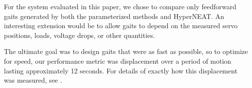 
For the system evaluated in this paper, we chose to compare only
feedforward gaits generated by both the parameterized methods and
HyperNEAT.  An interesting extension would be to allow gaits to depend
on the measured servo positions, loads, voltage drops, or other
quantities.

The ultimate goal was to design gaits that were as fast as possible,
so to optimize for speed, our performance metric was displacement over
a period of motion lasting approximately 12 seconds.  For details of
exactly how this displacement was measured, see
.
